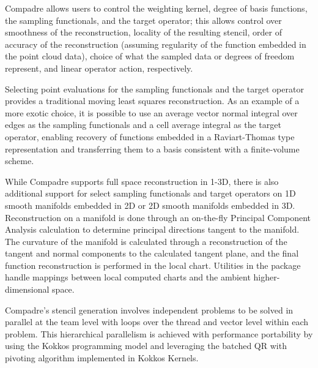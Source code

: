 Compadre allows users to control the weighting kernel, degree of basis functions, the sampling functionals, and the target operator; this allows control over smoothness of the reconstruction, locality of the resulting stencil, order of accuracy of the reconstruction (assuming regularity of the function embedded in the point cloud data), choice of what the sampled data or degrees of freedom represent, and linear operator action, respectively.

Selecting point evaluations for the sampling functionals and the target operator provides a traditional moving least squares reconstruction. As an example of a more exotic choice, it is possible to use an average vector normal integral over edges as the sampling functionals and a cell average integral as the target operator, enabling recovery of functions embedded in a Raviart-Thomas type representation and transferring them to a basis consistent with a finite-volume scheme.

While Compadre supports full space reconstruction in 1-3D, there is also additional support for select sampling functionals and target operators on 1D smooth manifolds embedded in 2D or 2D smooth manifolds embedded in 3D. Reconstruction on a manifold is done through an on-the-fly Principal Component Analysis calculation to determine principal directions tangent to the manifold. The curvature of the manifold is calculated through a reconstruction of the tangent and normal components to the calculated tangent plane, and the final function reconstruction is performed in the local chart. Utilities in the package handle mappings between local computed charts and the ambient higher-dimensional space.

Compadre's stencil generation involves independent problems to be solved in parallel at the team level with loops over the thread and vector level within each problem. This hierarchical parallelism is achieved with performance portability by using the Kokkos programming model and leveraging the batched QR with pivoting algorithm implemented in Kokkos Kernels.
